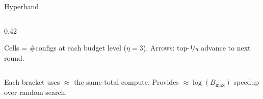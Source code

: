\begin{frame}{Hyperband}
\begin{columns}[T]
\begin{column}{0.42\textwidth}
\begin{center}
{%
        }
      \end{center}
      \vspace{-0.2em}
      {\scriptsize Cells = \#configs at each budget level ($\eta{=}3$). Arrows: top-$\nicefrac{1}{\eta}$ advance to next round.}
    \end{column}
  \end{columns}

  \vspace{0.3em}
  Each bracket uses $\approx$ the same total compute. Provides $\approx \log(B_{\max})$ speedup over random search.

\end{frame}

